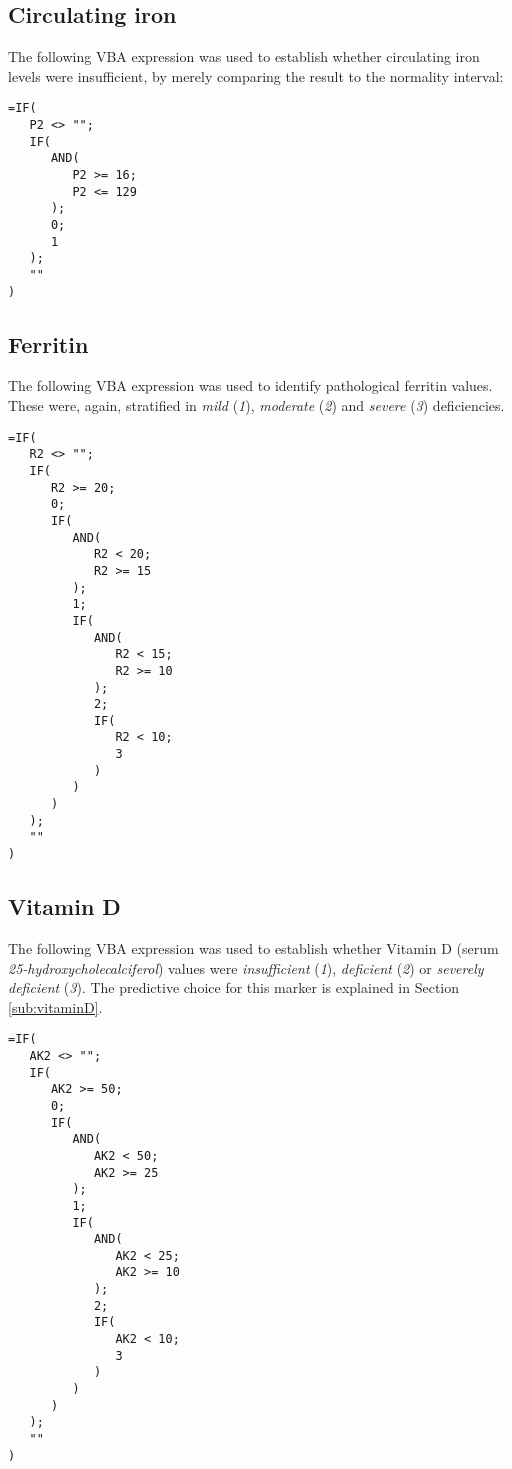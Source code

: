 \subsection{Circulating iron}\label{asub:patiron}
The following VBA expression was used to establish whether circulating iron levels were insufficient, by merely comparing the result to the normality interval:

\begin{minipage}{\linewidth}
\begin{lstlisting}
=IF(
   P2 <> "";
   IF(
      AND(
         P2 >= 16;
         P2 <= 129
      );
      0;
      1
   );
   ""
)
\end{lstlisting}
\end{minipage}

\subsection{Ferritin}\label{asub:patferritin}
The following VBA expression was used to identify pathological ferritin values. These were, again, stratified in \textit{mild} (\textit{1}), \textit{moderate} (\textit{2}) and \textit{severe} (\textit{3}) deficiencies.

\begin{lstlisting}
=IF(
   R2 <> "";
   IF(
      R2 >= 20;
      0;
      IF(
         AND(
            R2 < 20;
            R2 >= 15
         );
         1;
         IF(
            AND(
               R2 < 15;
               R2 >= 10
            );
            2;
            IF(
               R2 < 10;
               3
            )
         )
      )
   );
   ""
)
\end{lstlisting}

\subsection{Vitamin D}\label{asub:patvitaminD}
The following VBA expression was used to establish whether Vitamin D (serum \textit{25-hydroxycholecalciferol}) values were \textit{insufficient} (\textit{1}), \textit{deficient} (\textit{2}) or \textit{severely deficient} (\textit{3}). The predictive choice for this marker is explained in Section \ref{sub:vitaminD}.

\begin{lstlisting}
=IF(
   AK2 <> "";
   IF(
      AK2 >= 50;
      0;
      IF(
         AND(
            AK2 < 50;
            AK2 >= 25
         );
         1;
         IF(
            AND(
               AK2 < 25;
               AK2 >= 10
            );
            2;
            IF(
               AK2 < 10;
               3
            )
         )
      )
   );
   ""
)
\end{lstlisting}

